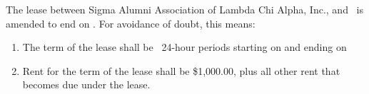 \documentclass{article}
\newcommand*\rentTotal{\$1,000.00}
\begin{document}
The lease between Sigma Alumni Association of Lambda Chi Alpha, Inc., and
\tenantName\ is amended to end on . For avoidance of
doubt, this means:

\begin{enumerate}
  \item The term of the lease shall be \the\termDuration\ 24-hour periods
  starting on  and ending on

  \item Rent for the term of the lease shall be \rentTotal, plus all other rent
  that becomes due under the lease.
\end{enumerate}
\end{document}
